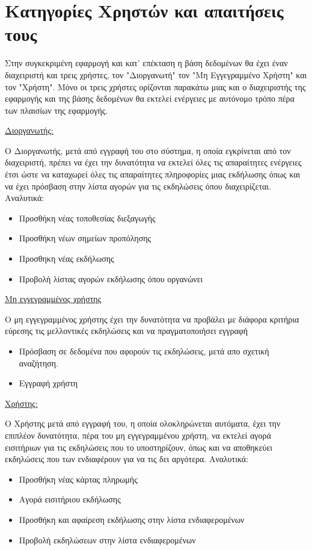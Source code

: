 ﻿
\section{Κατηγορίες Χρηστών και απαιτήσεις τους}

Στην συγκεκριμένη εφαρμογή και κατ' επέκταση η βάση δεδομένων θα έχει
έναν διαχειριστή και τρεις χρήστες, τον "Διοργανωτή" τον "Μη
Εγγεγραμμένο Χρήστη" και τον "Χρήστη". Μόνο οι τρεις χρήστες ορίζονται
παρακάτω μιας και ο διαχειριστής της εφαρμογής και της βάσης δεδομένων
θα εκτελεί ενέργειες με αυτόνομο τρόπο πέρα των πλαισίων της
εφαρμογής.

\underline{Διοργανωτής:}

Ο Διοργανωτής, μετά από εγγραφή του στο σύστημα, η οποία εγκρίνεται
από τον διαχειριστή, πρέπει να έχει την δυνατότητα να εκτελεί όλες τις
απαραίτητες ενέργειες έτσι ώστε να καταχωρεί όλες τις απαραίτητες
πληροφορίες μιας εκδήλωσης όπως και να έχει πρόσβαση στην λίστα αγορών
για τις εκδηλώσεις όπου διαχειρίζεται. Αναλυτικά:
\begin{itemize}[noitemsep]
\item Προσθήκη νέας τοποθεσίας διεξαγωγής
\item Προσθήκη νέων σημείων προπόλησης
\item Προσθηκη νέας εκδήλωσης
\item Προβολή λίστας αγορών εκδήλωσης όπου οργανώνει
\end{itemize}

\underline{Μη εγγεγραμμένος χρήστης}

Ο μη εγγεγραμμένος χρήστης έχει την δυνατότητα να προβάλει με διάφορα
κριτήρια εύρεσης τις μελλοντικές εκδηλώσεις και να πραγματοποιήσει
εγγραφή
\begin{itemize}[noitemsep]
\item Πρόσβαση σε δεδομένα που αφορούν τις εκδηλώσεις, μετά απο
  σχετική αναζήτηση.
\item Εγγραφή χρήστη
\end{itemize}

\underline{Χρήστης:}

Ο Χρήστης μετά από εγγραφή του, η οποία ολοκληρώνεται αυτόματα, έχει
την επιπλέον δυνατότητα, πέρα του μη εγγεγραμμένου χρήστη, να εκτελεί
αγορά εισιτήριων για τις εκδηλώσεις που το υποστηρίζουν, όπως και να
αποθηκεύει εκδηλώσεις που των ενδιαφέρουν για να τις δει
αργότερα. Αναλυτικά:
\begin{itemize}[noitemsep]
\item Προσθήκη νέας κάρτας πληρωμής
\item Αγορά εισιτήριου εκδήλωσης
\item Προσθήκη και αφαίρεση εκδήλωσης στην λίστα ενδιαφερομένων
\item Προβολή εκδηλώσεων στην λίστα ενδιαφερομένων
\end{itemize}


